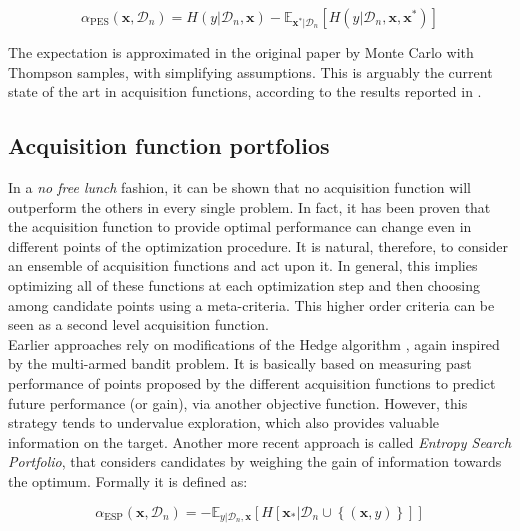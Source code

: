 \documentclass[10pt,a4paper,twoside]{book}
\begin{document}
\begin{equation}
\alpha_{\mathrm{PES}}(\boldsymbol{x}, \mathcal{D}_n) = H(y|\mathcal{D}_n, \boldsymbol{x}) - \mathbb{E}_{\boldsymbol{x}^*|\mathcal{D}_n}\left[ H(y |\mathcal{D}_n, \boldsymbol{x}, \boldsymbol{x}^*)  \right]
\end{equation}

The expectation is approximated in the original paper by Monte Carlo with Thompson samples, with simplifying assumptions. This is arguably the current state of the art in acquisition functions, according to the results reported in \cite{Hernandez-Lobato2014}.\\

\subsection{Acquisition function portfolios}

In a \textit{no free lunch} fashion, it can be shown that no acquisition function will outperform the others in every single problem. In fact, it has been proven \cite{Hoffman2011} that the acquisition function to provide optimal performance can change even in different points of the optimization procedure. It is natural, therefore, to consider an ensemble of acquisition functions and act upon it. In general, this implies optimizing all of these functions at each optimization step and then choosing among candidate points using a meta-criteria. This higher order criteria can be seen as a second level acquisition function.\\

Earlier approaches rely on modifications of the Hedge algorithm \cite{Auer1995}, again inspired by the multi-armed bandit problem. It is basically based on measuring past performance of points proposed by the different acquisition functions to predict future performance (or gain), via another objective function. However, this strategy tends to undervalue exploration, which also provides valuable information on the target. Another more recent approach \cite{Shahriari2014} is called \textit{Entropy Search Portfolio}, that considers candidates by weighing the gain of information towards the optimum. Formally it is defined as:

\begin{equation}
\alpha_{\mathrm{ESP}}(\boldsymbol{x}, \mathcal{D}_n) = - \mathbb{E}_{y|\mathcal{D}_n, \boldsymbol{x}}\left[ H \left[\boldsymbol{x}_* |\mathcal{D}_n \cup \left\lbrace  (\boldsymbol{x},y)\right\rbrace \right] \right]
\end{equation} 
\end{document}
